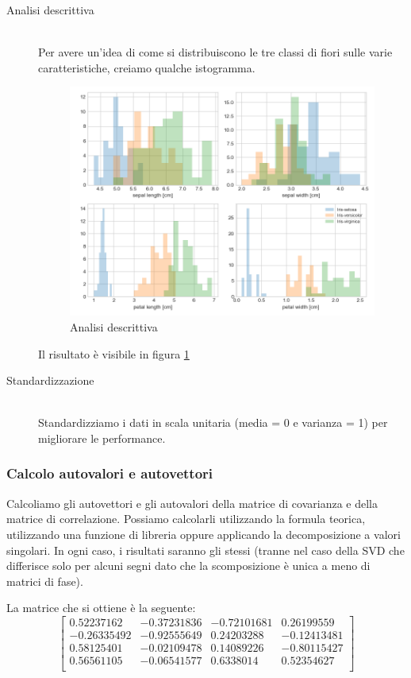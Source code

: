 \documentclass[12pt]{article}
\newcommand{\codice}[2]{}
\begin{document}
\begin{description}
				\item[Analisi descrittiva] \hfill \\
				Per avere un'idea di come si distribuiscono le tre classi di fiori sulle varie caratteristiche, creiamo qualche istogramma.				
				\codice{37}{56}				
				\begin{figure}
					\begin{center}
						\includegraphics[scale=.5]{isto}
						\caption{Analisi descrittiva}
						\label{fig:isto}
					\end{center}
				\end{figure}				
				Il risultato è visibile in figura \ref{fig:isto}
							
				\item[Standardizzazione] \hfill \\
				Standardizziamo i dati in scala unitaria (media = 0 e varianza = 1) per migliorare le performance.
				\codice{58}{59}
			\end{description} 
		
		\subsubsection{Calcolo autovalori e autovettori}
		
			Calcoliamo gli autovettori e gli autovalori della matrice di covarianza e della matrice di correlazione. Possiamo calcolarli utilizzando la formula teorica, utilizzando una funzione di libreria oppure applicando la decomposizione a valori singolari. In ogni caso, i risultati saranno gli stessi (tranne nel caso della SVD che differisce solo per alcuni segni dato che la scomposizione è unica a meno di matrici di fase).
			\codice{61}{94}
			La matrice che si ottiene è la seguente:
			$$\begin{bmatrix}
				0.52237162 & -0.37231836 & -0.72101681 & 0.26199559\\
				-0.26335492 & -0.92555649 & 0.24203288 & -0.12413481\\
				0.58125401 & -0.02109478 & 0.14089226 & -0.80115427\\
				0.56561105 & -0.06541577 & 0.6338014 & 0.52354627\\
			\end{bmatrix}$$
			
\end{document}
